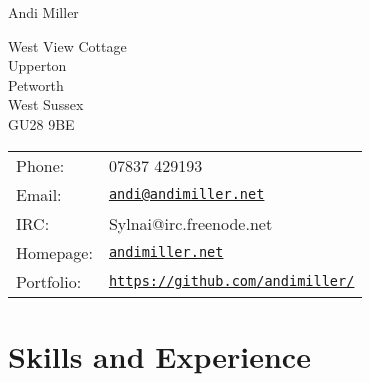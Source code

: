 \documentclass[a4paper]{article}
\def\name{Andi Miller}
\renewenvironment{itemize}{
  \begin{list}{}{
    \setlength{\leftmargin}{1.5em}
  }
}{
  \end{list}
}
\begin{document}
{\huge \name}


\vspace{0.25in}

\begin{minipage}{0.45\linewidth}
  West View Cottage \\
  Upperton \\
  Petworth \\
  West Sussex\\
  GU28 9BE\\
\end{minipage}
\begin{minipage}{0.45\linewidth}
  \begin{tabular}{ll}
    Phone: & 07837 429193 \\
    Email: & \href{mailto:andi@andimiller.net}{\tt andi@andimiller.net} \\
    IRC: & Sylnai@irc.freenode.net \\
    Homepage: & \href{http://andimiller.net/}{\tt andimiller.net} \\
    Portfolio: & \href{https://github.com/andimiller/}{\tt https://github.com/andimiller/}
  \end{tabular}
\end{minipage}



\section*{Skills and Experience}


\end{document}
